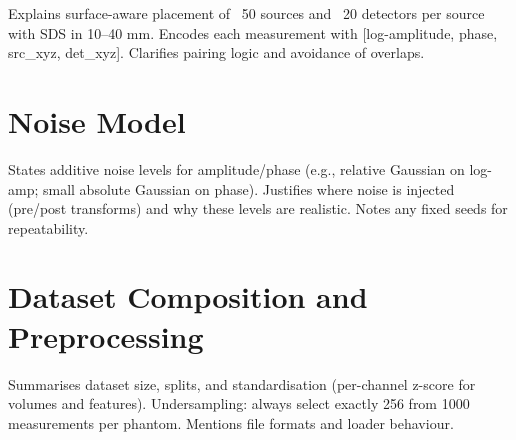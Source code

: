 Explains surface-aware placement of ~50 sources and ~20 detectors per source with SDS in 10–40 mm. Encodes each measurement with [log-amplitude, phase, src\_xyz, det\_xyz]. Clarifies pairing logic and avoidance of overlaps.


\section{Noise Model}

States additive noise levels for amplitude/phase (e.g., relative Gaussian on log-amp; small absolute Gaussian on phase). Justifies where noise is injected (pre/post transforms) and why these levels are realistic. Notes any fixed seeds for repeatability.


\section{Dataset Composition and Preprocessing}

Summarises dataset size, splits, and standardisation (per-channel z-score for volumes and features). Undersampling: always select exactly 256 from 1000 measurements per phantom. Mentions file formats and loader behaviour.

